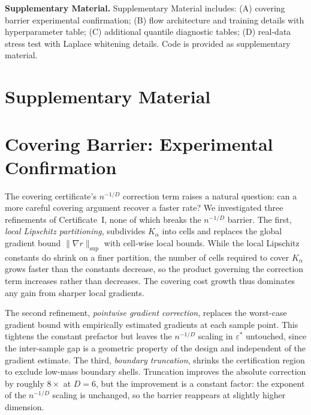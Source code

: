 \documentclass[12pt]{article}
\begin{document}
\bigskip
\noindent\textbf{Supplementary Material.} Supplementary Material includes: (A) covering barrier experimental confirmation; (B) flow architecture and training details with hyperparameter table; (C) additional quantile diagnostic tables; (D) real-data stress test with Laplace whitening details. Code is provided as supplementary material.






\clearpage
\section*{Supplementary Material}
\appendix

\section{Covering Barrier: Experimental Confirmation}\label{supp:exp01}

The covering certificate's $n^{-1/D}$ correction term raises a natural question: can a more careful covering argument recover a faster rate?
We investigated three refinements of Certificate~I, none of which breaks the $n^{-1/D}$ barrier.
The first, \emph{local Lipschitz partitioning}, subdivides $K_\alpha$ into cells and replaces the global gradient bound $\|\nabla r\|_{\sup}$ with cell-wise local bounds.
While the local Lipschitz constants do shrink on a finer partition, the number of cells required to cover $K_\alpha$ grows faster than the constants decrease, so the product governing the correction term increases rather than decreases.
The covering cost growth thus dominates any gain from sharper local gradients.

The second refinement, \emph{pointwise gradient correction}, replaces the worst-case gradient bound with empirically estimated gradients at each sample point.
This tightens the constant prefactor but leaves the $n^{-1/D}$ scaling in $\varepsilon^*$ untouched, since the inter-sample gap is a geometric property of the design and independent of the gradient estimate.
The third, \emph{boundary truncation}, shrinks the certification region to exclude low-mass boundary shells.
Truncation improves the absolute correction by roughly $8\times$ at $D = 6$, but the improvement is a constant factor: the exponent of the $n^{-1/D}$ scaling is unchanged, so the barrier reappears at slightly higher dimension.
\end{document}
